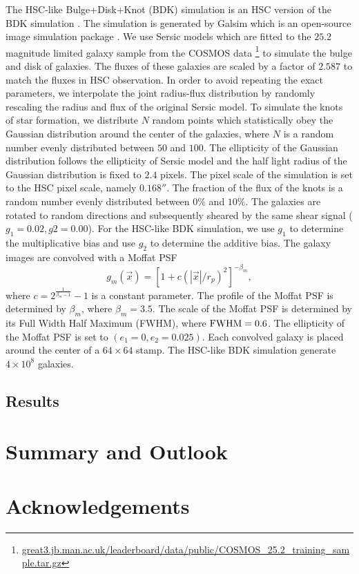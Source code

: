 \documentclass[a4paper,fleqn,usenatbib]{mnras}
\begin{document}
The HSC-like Bulge+Disk+Knot (BDK) simulation is an HSC version of the BDK
simulation \citep{metacal2}. The simulation is generated by Galsim which is an
open-source image simulation package \citep{GalSim}. We use Sersic models
\citep{Sersic1963} which are fitted to the $25.2$ magnitude limited galaxy
sample from the COSMOS data
\footnote{\url{great3.jb.man.ac.uk/leaderboard/data/public/COSMOS_25.2_training_sample.tar.gz}}
to simulate the bulge and disk of galaxies. The fluxes of these galaxies are
scaled by a factor of $2.587$ to match the fluxes in HSC observation. In order
to avoid repeating the exact parameters, we interpolate the joint radius-flux
distribution by randomly rescaling the radius and flux of the original Sersic
model. To simulate the knots of star formation, we distribute $N$ random points
which statistically obey the Gaussian distribution around the center of the
galaxies, where $N$ is a random number evenly distributed between $50$ and
$100$. The ellipticity of the Gaussian distribution follows the ellipticity of
Sersic model and the half light radius of the Gaussian distribution is fixed to
$2.4$ pixels. The pixel scale of the simulation is set to the HSC pixel scale,
namely $0.168''$. The fraction of the flux of the knots is a random number
evenly distributed between $0\%$ and $10\%$. The galaxies are rotated to random
directions and subsequently sheared by the same shear signal
($g_1=0.02,g2=0.00$). For the HSC-like BDK simulation, we use $g_1$ to
determine the multiplicative bias and use $g_2$ to determine the additive bias.
The galaxy images are convolved with a Moffat PSF \citep{Moffat1969}
\begin{equation}\label{Moffat PSF}
g_{m}(\vec{x})=[1+c(|\vec{x}|/r_p)^2]^{-\beta_m},  \end{equation} where
$c=2^{\frac{1}{\beta_m-1}}-1$ is a constant parameter. The profile of the
Moffat PSF is determined by $\beta_m$, where $\beta_{m}=3.5$. The scale of the
Moffat PSF is determined by its Full Width Half Maximum (FWHM), where
$\rm{FWHM}=0.6$.  The ellipticity of the Moffat PSF is set to
$(e_1=0,e_2=0.025)$. Each convolved galaxy is placed around the center of a
$64\times 64$ stamp. The HSC-like BDK simulation generate $4\times 10^8$
galaxies.


\subsection{Results}
\label{sec:Test-res}

\section{Summary and Outlook}
\label{sec:Summary}


\section*{Acknowledgements}



\appendix

\bsp	%
\label{lastpage}
\end{document}
